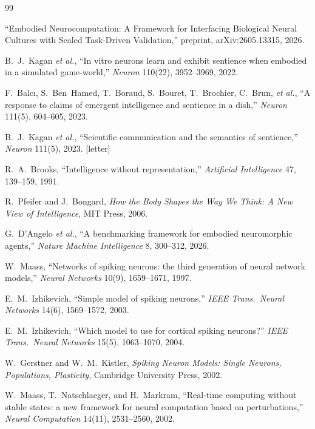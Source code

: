 \documentclass[10pt,a4paper]{article}
\begin{document}

\begin{thebibliography}{99}

``Embodied Neurocomputation: A Framework for Interfacing Biological
Neural Cultures with Scaled Task-Driven Validation,'' preprint,
arXiv:2605.13315, 2026.

B.~J.~Kagan \emph{et al.}, ``In vitro neurons learn and exhibit
sentience when embodied in a simulated game-world,'' \emph{Neuron}
110(22), 3952--3969, 2022.

F.~Balc{\i}, S.~Ben~Hamed, T.~Boraud, S.~Bouret, T.~Brochier,
C.~Brun, \emph{et al.}, ``A response to claims of emergent
intelligence and sentience in a dish,'' \emph{Neuron} 111(5),
604--605, 2023.

B.~J.~Kagan \emph{et al.}, ``Scientific communication and the
semantics of sentience,'' \emph{Neuron} 111(5), 2023. [letter]

R.~A.~Brooks, ``Intelligence without representation,''
\emph{Artificial Intelligence} 47, 139--159, 1991.

R.~Pfeifer and J.~Bongard, \emph{How the Body Shapes the Way We
Think: A New View of Intelligence}, MIT Press, 2006.

G.~D'Angelo \emph{et al.}, ``A benchmarking framework for embodied
neuromorphic agents,'' \emph{Nature Machine Intelligence} 8,
300--312, 2026.

W.~Maass, ``Networks of spiking neurons: the third generation of
neural network models,'' \emph{Neural Networks} 10(9), 1659--1671,
1997.

E.~M.~Izhikevich, ``Simple model of spiking neurons,''
\emph{IEEE Trans.\ Neural Networks} 14(6), 1569--1572, 2003.

E.~M.~Izhikevich, ``Which model to use for cortical spiking
neurons?'' \emph{IEEE Trans.\ Neural Networks} 15(5), 1063--1070,
2004.

W.~Gerstner and W.~M.~Kistler, \emph{Spiking Neuron Models: Single
Neurons, Populations, Plasticity}, Cambridge University Press, 2002.

W.~Maass, T.~Natschlaeger, and H.~Markram, ``Real-time computing
without stable states: a new framework for neural computation based
on perturbations,'' \emph{Neural Computation} 14(11), 2531--2560,
2002.


\end{thebibliography}
\end{document}
